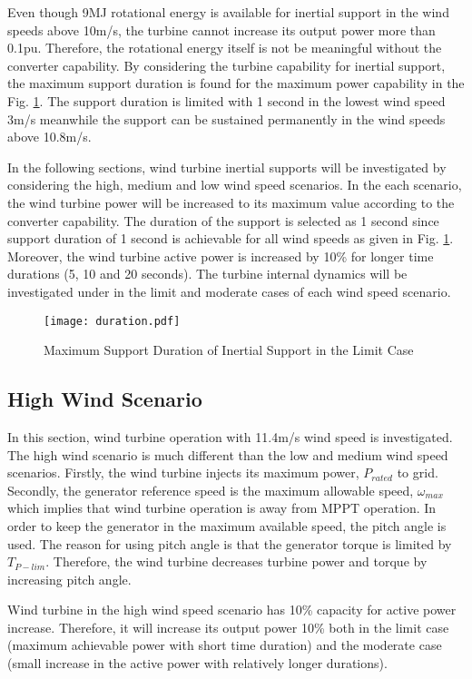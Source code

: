 Even though 9MJ rotational energy is available for inertial support in the wind speeds above 10m/s, the turbine cannot increase its output power more than 0.1pu. Therefore, the rotational energy itself is not be meaningful without the converter capability. By considering the turbine capability for inertial support, the maximum support duration is found for the maximum power capability in the Fig. \ref{duration}. The support duration is limited with 1 second in the lowest wind speed 3m/s meanwhile the support can be sustained permanently in the wind speeds above 10.8m/s.\par 
In the following sections, wind turbine inertial supports will be investigated by considering the high, medium and low wind speed scenarios. In the each scenario, the wind turbine power will be increased to its maximum value according to the converter capability. The duration of the support is selected as 1 second since support duration of 1 second is achievable for all wind speeds as given in Fig. \ref{duration}. Moreover, the wind turbine active power is increased by 10\% for longer time durations (5, 10 and 20 seconds). The turbine internal dynamics will be investigated under in the limit and moderate cases of each wind speed scenario.
\begin{figure}[h!]
	\centering
	\texttt{[image: duration.pdf]}
	\caption{Maximum Support Duration of Inertial Support in the Limit Case}
	\label{duration}
\end{figure}
\subsection{High Wind Scenario}
In this section, wind turbine operation with 11.4m/s wind speed is investigated. The high wind scenario is much different than the low and medium wind speed scenarios. Firstly, the wind turbine injects its maximum power, $P_{rated}$ to grid. Secondly, the generator reference speed is the maximum allowable speed, $\omega_{max}$ which implies that wind turbine operation is away from MPPT operation. In order to keep the generator in the maximum available speed, the pitch angle is used. The reason for using pitch angle is that the generator torque is limited by $T_{P-lim}$. Therefore, the wind turbine decreases turbine power and torque by increasing pitch angle.\par
Wind turbine in the high wind speed scenario has 10\% capacity for active power increase. Therefore, it will increase its output power 10\% both in the limit case (maximum achievable power with short time duration) and the moderate case (small increase in the active power with relatively longer durations).
